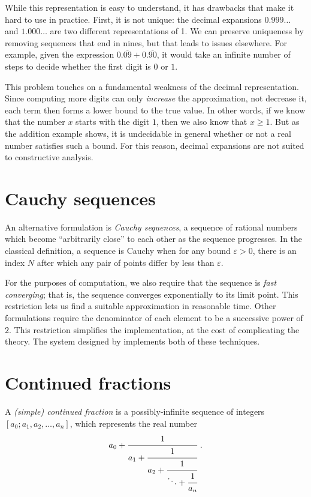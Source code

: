 \documentclass[leqno]{report}
\begin{document}
While this representation is easy to understand, it has drawbacks that make it hard to use in practice. First, it is not unique: the decimal expansions $0.999\ldots$ and $1.000\ldots$ are two different representations of 1. We can preserve uniqueness by removing sequences that end in nines, but that leads to issues elsewhere. For example, given the expression $0.\overline{09} + 0.\overline{90}$, it would take an infinite number of steps to decide whether the first digit is $0$ or $1$.

This problem touches on a fundamental weakness of the decimal representation. Since computing more digits can only \emph{increase} the approximation, not decrease it, each term then forms a lower bound to the true value. In other words, if we know that the number $x$ starts with the digit $1$, then we also know that $x \geq 1$. But as the addition example shows, it is undecidable in general whether or not a real number satisfies such a bound. For this reason, decimal expansions are not suited to constructive analysis.

\section{Cauchy sequences}

An alternative formulation is \textit{Cauchy sequences}, a sequence of rational numbers which become ``arbitrarily close'' to each other as the sequence progresses. In the classical definition, a sequence is Cauchy when for any bound $\varepsilon > 0$, there is an index $N$ after which any pair of points differ by less than $\varepsilon$.

For the purposes of computation, we also require that the sequence is \textit{fast converging}; that is, the sequence converges exponentially to its limit point. This restriction lets us find a suitable approximation in reasonable time. Other formulations require the denominator of each element to be a successive power of $2$. This restriction simplifies the implementation, at the cost of complicating the theory. The system designed by \citet{gowland2000correctness} implements both of these techniques.

\section{Continued fractions}

A \textit{(simple) continued fraction} is a possibly-infinite sequence of integers $[a_0; a_1, a_2, \ldots, a_n]$, which represents the real number
\[
    a_0 + \cfrac{1}{a_1 + \cfrac{1}{a_2 + \cfrac{1}{\ddots + \cfrac{1}{a_n}}}}
    \ .
\]
\end{document}
